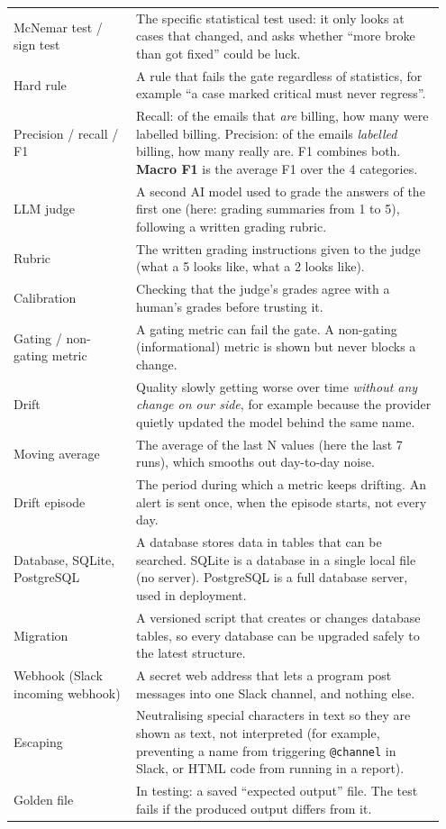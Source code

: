 \documentclass[11pt,a4paper]{article}
\begin{document}
\begin{longtable}{@{}p{0.27\linewidth}p{0.68\linewidth}@{}}
McNemar test / sign test & The specific statistical test used: it only looks at cases that changed, and asks whether ``more broke than got fixed'' could be luck. \\
Hard rule & A rule that fails the gate regardless of statistics, for example ``a case marked critical must never regress''. \\
Precision / recall / F1 & Recall: of the emails that \emph{are} billing, how many were labelled billing. Precision: of the emails \emph{labelled} billing, how many really are. F1 combines both. \textbf{Macro F1} is the average F1 over the 4 categories. \\
LLM judge & A second AI model used to grade the answers of the first one (here: grading summaries from 1 to 5), following a written grading rubric. \\
Rubric & The written grading instructions given to the judge (what a 5 looks like, what a 2 looks like). \\
Calibration & Checking that the judge's grades agree with a human's grades before trusting it. \\
Gating / non-gating metric & A gating metric can fail the gate. A non-gating (informational) metric is shown but never blocks a change. \\
Drift & Quality slowly getting worse over time \emph{without any change on our side}, for example because the provider quietly updated the model behind the same name. \\
Moving average & The average of the last N values (here the last 7 runs), which smooths out day-to-day noise. \\
Drift episode & The period during which a metric keeps drifting. An alert is sent once, when the episode starts, not every day. \\
Database, SQLite, PostgreSQL & A database stores data in tables that can be searched. SQLite is a database in a single local file (no server). PostgreSQL is a full database server, used in deployment. \\
Migration & A versioned script that creates or changes database tables, so every database can be upgraded safely to the latest structure. \\
Webhook (Slack incoming webhook) & A secret web address that lets a program post messages into one Slack channel, and nothing else. \\
Escaping & Neutralising special characters in text so they are shown as text, not interpreted (for example, preventing a name from triggering \texttt{@channel} in Slack, or HTML code from running in a report). \\
Golden file & In testing: a saved ``expected output'' file. The test fails if the produced output differs from it. \\
\bottomrule
\end{longtable}
\end{document}
